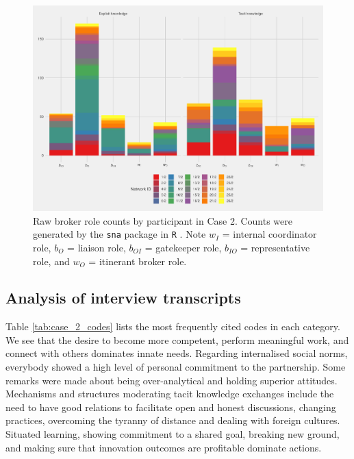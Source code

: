 \begin{figure}[hbt!]
\centering
\includegraphics[width = \textwidth]{Images/gf_case2.pdf}
\caption[Raw broker role counts by participant in Case 2]{Raw broker role counts by participant in Case 2. Counts were generated by the \texttt{sna} package in \texttt{R} \citep{butts2016sna}. Note $w_I$ = internal coordinator role, $b_O$ = liaison role, $b_{OI}$ = gatekeeper role, $b_{IO}$ = representative role, and $w_O$ = itinerant broker role.}
\label{fig:gf_c2}
\end{figure}

\subsection{Analysis of interview transcripts}

Table \ref{tab:case_2_codes} lists the most frequently cited codes in each category. We see that the desire to become more competent, perform meaningful work, and connect with others dominates innate needs. Regarding internalised social norms, everybody showed a high level of personal commitment to the partnership. Some remarks were made about being over-analytical and holding superior attitudes. Mechanisms and structures moderating tacit knowledge exchanges include the need to have good relations to facilitate open and honest discussions, changing practices,  overcoming the tyranny of distance and dealing with foreign cultures. Situated learning, showing commitment to a shared goal, breaking new ground, and making sure that innovation outcomes are profitable dominate actions.

